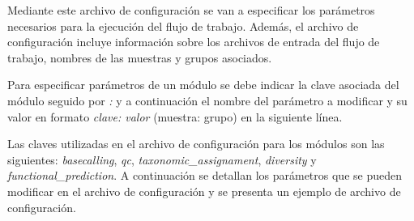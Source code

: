 Mediante este archivo de configuración se van a especificar los parámetros necesarios para la ejecución del flujo de trabajo.
Además, el archivo de configuración incluye información sobre los archivos de entrada del flujo de trabajo, nombres de las muestras y grupos asociados.

Para especificar parámetros de un módulo se debe indicar la clave asociada del módulo seguido por \textit{:} y a continuación el nombre del parámetro a modificar y su valor en formato \textit{clave: valor} (muestra: grupo) en la siguiente línea.

Las claves utilizadas en el archivo de configuración para los módulos son las siguientes: \textit{basecalling}, \textit{qc}, \textit{taxonomic\_assignament}, \textit{diversity} y \textit{functional\_prediction}.
A continuación se detallan los parámetros que se pueden modificar en el archivo de configuración y se presenta un ejemplo de archivo de configuración.%

